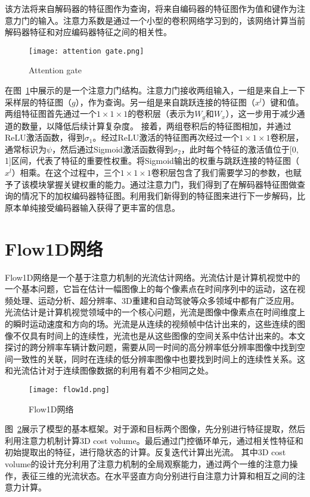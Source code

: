 该方法将来自解码器的特征图作为查询，将来自编码器的特征图作为值和键作为注意力门的输入。注意力系数是通过一个小型的卷积网络学习到的，该网络计算当前解码器特征和对应编码器特征之间的相关性。
\begin{figure}[h]
  \centering
  \texttt{[image: attention gate.png]}
  \caption{Attention gate}
  \label{fig:attentiongate}
\end{figure}


在图~\ref{fig:attentiongate}中展示的是一个注意力门结构。注意力门接收两组输入，一组是来自上一下采样层的特征图（\(g\)），作为查询。另一组是来自跳跃连接的特征图（\(x^l\)）键和值。
两组特征图首先通过一个\(1 \times 1 \times 1\)的卷积层（表示为\(W_g\)和\(W_x\)），这一步用于减少通道的数量，以降低后续计算复杂度。
接着，两组卷积后的特征图相加，并通过ReLU激活函数，得到\( \sigma_1\)。经过ReLU激活的特征图再次经过一个\(1 \times 1 \times 1\)卷积层，通常标识为\(\psi\)，然后通过Sigmoid激活函数得到\( \sigma_2\)，此时每个特征的激活值位于[0, 1]区间，代表了特征的重要性权重。将Sigmoid输出的权重与跳跃连接的特征图（\(x^l\)）相乘。在这个过程中，三个\(1 \times 1 \times 1\)卷积层包含了我们需要学习的参数，也赋予了该模块掌握关键权重的能力。通过注意力门，我们得到了在解码器特征图做查询的情况下的加权编码器特征图。利用我们新得到的特征图来进行下一步解码，比原本单纯接受编码器输入获得了更丰富的信息。

\section{Flow1D网络}
Flow1D\cite{2022ComparisonPoolingMethodsConvolutionalNeuralNetworks}网络是一个基于注意力机制的光流估计网络。光流估计是计算机视觉中的一个基本问题，它旨在估计一幅图像上的每个像素点在时间序列中的运动，这在视频处理、运动分析、超分辨率、3D重建和自动驾驶等众多领域中都有广泛应用。光流估计是计算机视觉领域中的一个核心问题，光流是图像中像素点在时间维度上的瞬时运动速度和方向的场。光流是从连续的视频帧中估计出来的，这些连续的图像不仅具有时间上的连续性，光流也是从这些图像的空间关系中估计出来的。本文探讨的跨分辨率车辆计数问题，需要从同一时间的高分辨率低分辨率图像中找到空间一致性的关联，同时在连续的低分辨率图像中也要找到时间上的连续性关系。这和光流估计对于连续图像数据的利用有着不少相同之处。

\begin{figure}[h]
  \centering
  \texttt{[image: flow1d.png]}
  \caption{Flow1D网络}
  \label{fig:Flow1D}
\end{figure}

图~\ref{fig:Flow1D}展示了模型的基本框架。对于源和目标两个图像，先分别进行特征提取，然后利用注意力机制计算3D cost volume。最后通过门控循环单元，通过相关性特征和初始提取出的特征，进行隐状态的计算。反复迭代计算出光流。
其中3D cost volume的设计充分利用了注意力机制的全局观察能力，通过两个一维的注意力操作，表征三维的光流状态。在水平竖直方向分别进行自注意力计算和相互之间的注意力计算。

